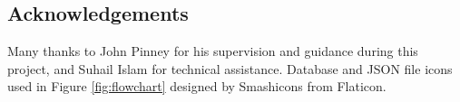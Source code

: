 \documentclass[12pt,a4paper]{article}
\begin{document}
\begin{abstract}
\end{abstract}

\newpage
\begin{center}
\section*{Acknowledgements}
\doublespacing
Many thanks to John Pinney for his supervision and guidance during this project, and Suhail Islam for technical assistance. Database and JSON file icons used in Figure \ref{fig:flowchart} designed by Smashicons from Flaticon.
\end{center}
\newpage
\tableofcontents
\newpage
\end{document}
